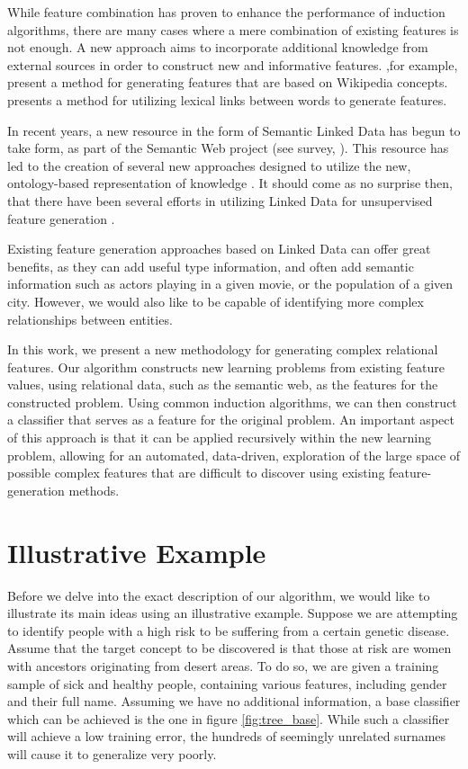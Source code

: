 \documentclass[twoside,11pt]{article}
\theoremstyle{definition}
\begin{document}
While feature combination has proven to enhance the performance of induction algorithms, there are many cases where a mere combination of existing features is not enough. A new approach aims to incorporate additional knowledge from external sources in order to construct new and informative features.
 ,for example, present a method for generating features that are based on Wikipedia concepts.  presents a method for utilizing lexical links between words to generate features.

In recent years, a new resource in the form of Semantic Linked Data has begun to take form, as part of the Semantic Web project (see survey, ). This resource has led to the creation of several new approaches designed to utilize the new, ontology-based representation of knowledge \cite{losch2012graph,rios2014statistical}.
It should come as no surprise then, that there have been several efforts in utilizing Linked Data for unsupervised feature generation \cite{cheng2011automated, paulheim2012unsupervised}.

Existing feature generation approaches based on Linked Data can offer great benefits, as they can add useful type information, and often add semantic information such as actors playing in a given movie, or the population of a given city.
However, we would also like to be capable of identifying more complex relationships between entities.

In this work, we present a new methodology for generating complex relational features.  Our algorithm constructs new learning problems from existing feature values, using relational data, such as the semantic web, as the features for the constructed problem.
Using common induction algorithms, we can then construct a classifier that serves as a feature for the original problem. An important aspect of this approach is that it can be applied recursively within the new learning problem, allowing for an automated, data-driven, exploration of the large space of possible  complex features that are difficult to discover using existing feature-generation methods.

\section{Illustrative Example}

Before we delve into the exact description of our algorithm, we would like to illustrate its main ideas using an illustrative example.
Suppose we are attempting to identify people with a high risk to be suffering from a certain genetic disease. Assume that the target concept to be discovered is that those at risk are women with ancestors originating from desert areas. To do so, we are given a training sample of sick and healthy people, containing various features, including gender and their full name.
Assuming we have no additional information, a base classifier which can be achieved is the one in figure \ref{fig:tree_base}. While such a classifier will achieve a low training error, the hundreds of seemingly unrelated surnames will cause it to generalize very poorly.
\end{document}
